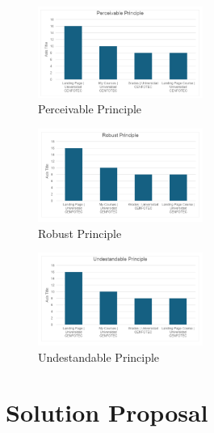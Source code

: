 \documentclass{IEEEtran}
\begin{document}
\begin{figure}[H]
    \includegraphics[width=0.48\textwidth]{images/perceivablePrinciple.png}
    \caption{Perceivable Principle}
    \label{fig:perceivablePrinciple}
\end{figure}

\begin{figure}[H]
    \includegraphics[width=0.48\textwidth]{images/robustPrinciple.png}
    \caption{Robust Principle}
    \label{fig:robustPrinciple}
\end{figure}

\begin{figure}[H]
    \includegraphics[width=0.48\textwidth]{images/undestandablePrinciple.png}
    \caption{Undestandable Principle}
    \label{fig:undestandablePrinciple}
\end{figure}





\section{Solution Proposal}
\end{document}
